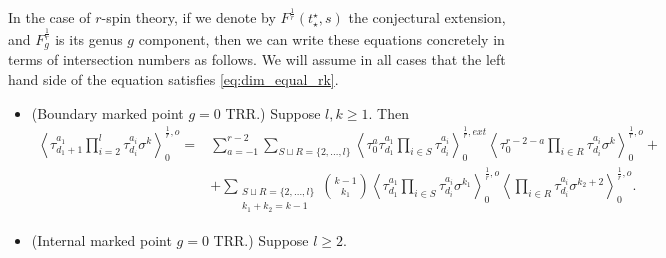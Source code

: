 \documentclass[11pt]{amsart}
\theoremstyle{definition}
\theoremstyle{remark}
\newcommand{\<}{\left<}
\renewcommand{\>}{\right>}
\numberwithin{equation}{section}
\begin{document}
In the case of $r$-spin theory, if we denote by $F^{\frac{1}{r}}(t_\star^\star,s)$ the conjectural extension, and $F^{\frac{1}{r}}_g$ is its genus $g$ component, then we can write these equations concretely in terms of intersection numbers as follows. We will assume in all cases that the left hand side of the equation satisfies \eqref{eq:dim_equal_rk}.
\begin{itemize}
\item[(a)] (Boundary marked point %
$g=0$ TRR.) Suppose %
$l,k\geq 1$.  %
Then
\begin{align*}
\< \tau_{d_1+1}^{a_1}\prod_{i=2}^l\tau^{a_i}_{d_i}\sigma^k\>^{\frac{1}{r},o}_0=&
\sum_{a=-1}^{r-2}\sum_{S \sqcup R = \{2,\ldots,l\}}\left\langle \tau_0^{a}\tau_{d_1}^{a_1}\prod_{i \in S}\tau_{d_i}^{a_i}\right\rangle^{\frac{1}{r},{ext}}_0
\left\langle \tau_0^{r-2-a}\prod_{i\in R}\tau^{a_i}_{d_i}\sigma^k\right\rangle^{\frac{1}{r},o}_0+\\
&+\sum_{\substack{S \sqcup R = \{2,\ldots,l\} \\ k_1 + k_2 = k-1}} \binom{k-1}{k_1} \left\langle \tau^{a_1}_{d_1}\prod_{i \in S} \tau^{a_i}_{d_i}\sigma^{k_1}\right\rangle^{\frac{1}{r},o}_0 \left\langle \prod_{i \in R} \tau^{a_i}_{d_i} \sigma^{k_2+2}\right\rangle^{\frac{1}{r}, o}_0.
\end{align*}
\item[(b)] (Internal %
marked point %
$g=0$ TRR.) Suppose %
$l\geq 2$.  %

\end{itemize}
\end{document}
